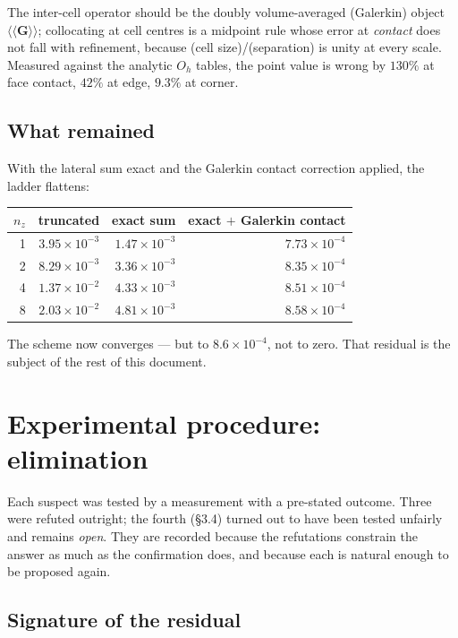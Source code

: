 \documentclass[11pt,a4paper]{article}
\begin{document}
The inter-cell operator should be the doubly volume-averaged (Galerkin) object
$\langle\langle \bm{G}\rangle\rangle$; collocating at cell centres is a midpoint
rule whose error at \emph{contact} does not fall with refinement, because
(cell size)/(separation) is unity at every scale. Measured against the analytic
$O_h$ tables, the point value is wrong by $130\%$ at face contact, $42\%$ at
edge, $9.3\%$ at corner.

\subsection{What remained}

With the lateral sum exact and the Galerkin contact correction applied, the
ladder flattens:

\begin{center}
\begin{tabular}{rrrr}
\toprule
$n_z$ & truncated & exact sum & exact $+$ Galerkin contact \\
\midrule
1 & $3.95\times10^{-3}$ & $1.47\times10^{-3}$ & $7.73\times10^{-4}$ \\
2 & $8.29\times10^{-3}$ & $3.36\times10^{-3}$ & $8.35\times10^{-4}$ \\
4 & $1.37\times10^{-2}$ & $4.33\times10^{-3}$ & $8.51\times10^{-4}$ \\
8 & $2.03\times10^{-2}$ & $4.81\times10^{-3}$ & $8.58\times10^{-4}$ \\
\bottomrule
\end{tabular}
\end{center}

The scheme now converges --- but to $8.6\times10^{-4}$, not to zero. That
residual is the subject of the rest of this document.

\section{Experimental procedure: elimination}

Each suspect was tested by a measurement with a pre-stated outcome. Three were
refuted outright; the fourth (\S3.4) turned out to have been tested unfairly and
remains \emph{open}. They are recorded because the refutations constrain the
answer as much as the confirmation does, and because each is natural enough to be
proposed again.

\subsection{Signature of the residual}
\end{document}
